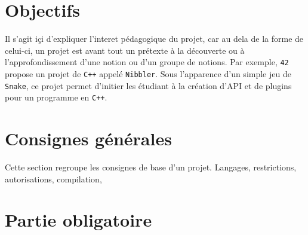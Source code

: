 \documentclass{42-fr}
\begin{document}
\chapter{Objectifs}

    Il s'agit i\c ci d'expliquer l'interet p\'edagogique du projet,
    car au dela de la forme de celui-ci, un projet est avant tout un
    pr\'etexte \`a la d\'ecouverte ou \`a l'approfondissement d'une
    notion ou d'un groupe de notions. Par exemple, \texttt{42} propose
    un projet de \texttt{C++} appel\'e \texttt{Nibbler}. Sous
    l'apparence d'un simple jeu de \texttt{Snake}, ce projet permet
    d'initier les \'etudiant \`a la cr\'eation d'API et de plugins
    pour un programme en \texttt{C++}.



\chapter{Consignes g\'en\'erales}

    Cette section regroupe les consignes de base d'un
    projet. Langages, restrictions, autorisations, compilation,



\chapter{Partie obligatoire}
\end{document}

